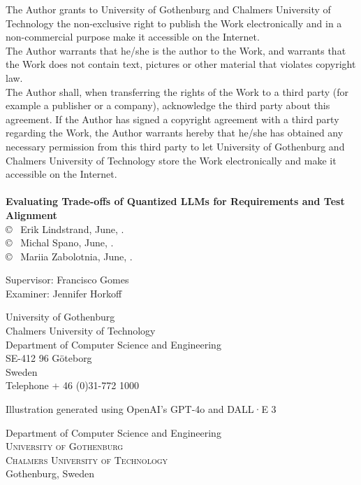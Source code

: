 \documentclass[12pt,a4paper,twoside,openright]{report}
\newcommand{\backgroundpic}[3]{
	\put(#1,#2){
	\parbox[b][\paperheight]{\paperwidth}{
	\centering
	\texttt{[image: \#3]}}}}
\begin{document}
\newpage
\AddToShipoutPicture*{\backgroundpic{-20}{56.7}{frontpage_gu_eng_vec_m2.pdf}}
\addtolength{\voffset}{2cm}
\thispagestyle{empty}
The Author grants to University of Gothenburg and Chalmers University of Technology the non-exclusive right to publish the Work electronically and in a non-commercial purpose make it accessible on the Internet.\\
The Author warrants that he/she is the author to the Work, and warrants that the Work does not contain text, pictures or other material that violates copyright law. \\

The Author shall, when transferring the rights of the Work to a third party (for example a publisher or a company), acknowledge the third party about this agreement. If the Author has signed a copyright agreement with a third party regarding the Work, the Author warrants hereby that he/she has obtained any necessary permission from this third party to let University of Gothenburg and Chalmers University of Technology store the Work electronically and make it accessible on the Internet.\\ \\

\textbf{Evaluating Trade-offs of Quantized LLMs for Requirements and Test Alignment}\\

\copyright ~ Erik Lindstrand, June, \the\year. \setlength{\parskip}{1cm} \\
\copyright ~ Michal Spano, June, \the\year. \setlength{\parskip}{1cm} \\
\copyright ~ Mariia Zabolotnia, June, \the\year. \setlength{\parskip}{1cm}

Supervisor: Francisco Gomes\\
Examiner: Jennifer Horkoff\setlength{\parskip}{1cm}

University of Gothenburg\\
Chalmers University of Technology\\
Department of Computer Science and Engineering\\
SE-412 96 G{\"o}teborg\\
Sweden\\
Telephone + 46 (0)31-772 1000 \setlength{\parskip}{0.5cm}

Illustration generated using OpenAI's GPT-4o and DALL·E 3 \setlength{\parskip}{2.9cm}

Department of Computer Science and Engineering \\
\textsc{University of Gothenburg} \\
\textsc{Chalmers University of Technology} \\
Gothenburg, Sweden \the\year
\end{document}
